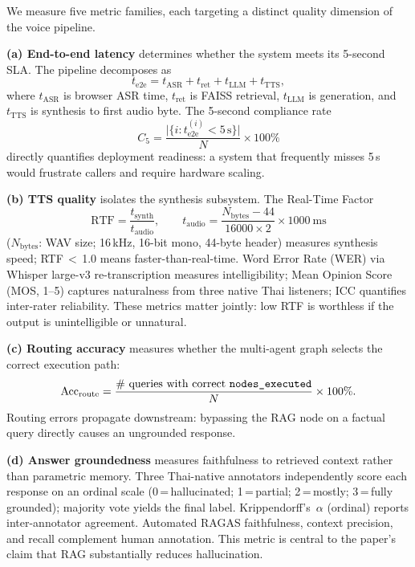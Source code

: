 \documentclass[10pt, a4paper, twocolumn]{article}
\begin{document}
We measure five metric families, each targeting a distinct quality
dimension of the voice pipeline.

\noindent\textbf{(a) End-to-end latency} determines whether the system
meets its 5-second SLA.
The pipeline decomposes as
\begin{equation}
  t_\text{e2e} = t_\text{ASR} + t_\text{ret} + t_\text{LLM} + t_\text{TTS},
  \label{eq:e2e}
\end{equation}
where $t_\text{ASR}$ is browser ASR time, $t_\text{ret}$ is FAISS
retrieval, $t_\text{LLM}$ is generation, and $t_\text{TTS}$ is
synthesis to first audio byte.
The 5-second compliance rate
\begin{equation}
  C_5 = \frac{\bigl|\{i : t_\text{e2e}^{(i)} < 5\,\text{s}\}\bigr|}{N}
        \times 100\%
  \label{eq:c5}
\end{equation}
directly quantifies deployment readiness: a system that frequently
misses 5\,s would frustrate callers and require hardware scaling.

\noindent\textbf{(b) TTS quality} isolates the synthesis subsystem.
The Real-Time Factor
\begin{equation}
  \text{RTF} = \frac{t_\text{synth}}{t_\text{audio}}, \qquad
  t_\text{audio} = \frac{N_\text{bytes}-44}{16000 \times 2}
                   \times 1000\ \text{ms}
  \label{eq:rtf}
\end{equation}
($N_\text{bytes}$: WAV size; 16\,kHz, 16-bit mono, 44-byte header)
measures synthesis speed; RTF\,${<}$\,1.0 means faster-than-real-time.
Word Error Rate (WER) via Whisper large-v3 re-transcription measures
intelligibility; Mean Opinion Score (MOS, 1--5) captures naturalness
from three native Thai listeners; ICC quantifies inter-rater reliability.
These metrics matter jointly: low RTF is worthless if the output is
unintelligible or unnatural.

\noindent\textbf{(c) Routing accuracy} measures whether the
multi-agent graph selects the correct execution path:
\begin{equation}
  \mathrm{Acc}_\text{route} =
    \frac{\text{\# queries with correct \texttt{nodes\_executed}}}{N}
    \times 100\%.
  \label{eq:routing}
\end{equation}
Routing errors propagate downstream: bypassing the RAG node on a
factual query directly causes an ungrounded response.

\noindent\textbf{(d) Answer groundedness} measures faithfulness to
retrieved context rather than parametric memory.
Three Thai-native annotators independently score each response on an
ordinal scale (0\,=\,hallucinated; 1\,=\,partial; 2\,=\,mostly;
3\,=\,fully grounded); majority vote yields the final label.
Krippendorff's~$\alpha$ (ordinal) reports inter-annotator agreement.
Automated RAGAS faithfulness, context precision, and recall
\cite{es2023ragas} complement human annotation.
This metric is central to the paper's claim that RAG substantially
reduces hallucination.
\end{document}
